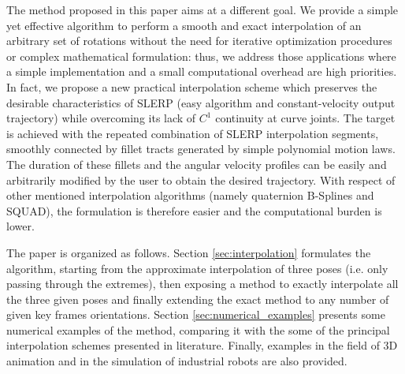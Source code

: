 The method proposed in this paper aims at a different goal. We provide a simple yet effective algorithm to perform a smooth and exact interpolation of an arbitrary set of rotations without the need for iterative optimization procedures or complex mathematical formulation: thus, we address those applications where a simple implementation and a small computational overhead are high priorities. In fact, we propose a new practical interpolation scheme which preserves the desirable characteristics of SLERP (easy algorithm and constant-velocity output trajectory) while overcoming its lack of $C^{1}$ continuity at curve joints. The target is achieved with the repeated combination of SLERP interpolation segments, smoothly connected by fillet tracts generated by simple polynomial motion laws. The duration of these fillets and the angular velocity profiles can be easily and arbitrarily modified by the user to obtain the desired trajectory. With respect of other mentioned interpolation algorithms (namely quaternion B-Splines and SQUAD), the formulation is therefore easier and the computational burden is lower.

The paper is organized as follows. Section \ref{sec:interpolation} formulates the algorithm, starting from the approximate interpolation of three poses (i.e. only passing through the extremes), then exposing a method to exactly interpolate all the three given poses and finally extending the exact method to any number of given key frames orientations. Section \ref{sec:numerical_examples} presents some numerical examples of the method, comparing it with the some of the principal interpolation schemes presented in literature. Finally, examples in the field of 3D animation and in the simulation of industrial robots are also provided. %


